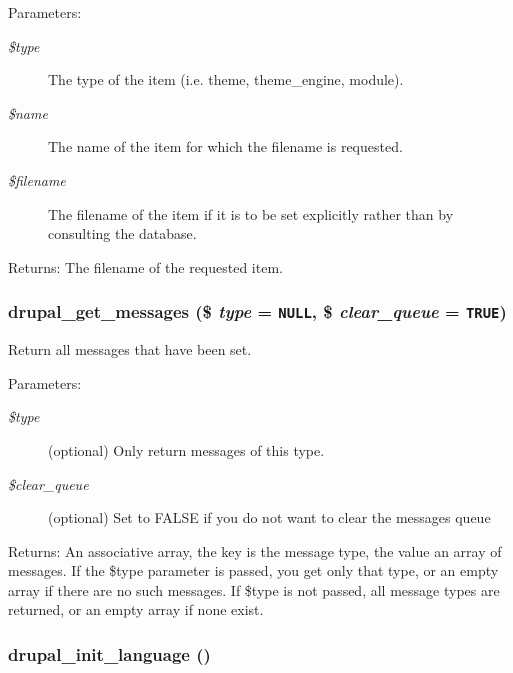 \begin{Desc}
\item[Parameters:]
\begin{description}
\item[{\em \$type}]The type of the item (i.e. theme, theme\_\-engine, module). \item[{\em \$name}]The name of the item for which the filename is requested. \item[{\em \$filename}]The filename of the item if it is to be set explicitly rather than by consulting the database.\end{description}
\end{Desc}
\begin{Desc}
\item[Returns:]The filename of the requested item. \end{Desc}
\hypertarget{bootstrap_8inc_2c9915d030bad8c5bacf6de25e6fd14c}{
\subsubsection[{drupal\_\-get\_\-messages}]{\setlength{\rightskip}{0pt plus 5cm}drupal\_\-get\_\-messages (\$ {\em type} = {\tt NULL}, \/  \$ {\em clear\_\-queue} = {\tt TRUE})}}
\label{bootstrap_8inc_2c9915d030bad8c5bacf6de25e6fd14c}


Return all messages that have been set.

\begin{Desc}
\item[Parameters:]
\begin{description}
\item[{\em \$type}](optional) Only return messages of this type. \item[{\em \$clear\_\-queue}](optional) Set to FALSE if you do not want to clear the messages queue \end{description}
\end{Desc}
\begin{Desc}
\item[Returns:]An associative array, the key is the message type, the value an array of messages. If the \$type parameter is passed, you get only that type, or an empty array if there are no such messages. If \$type is not passed, all message types are returned, or an empty array if none exist. \end{Desc}
\hypertarget{bootstrap_8inc_5f67d97a363fcc3f51bf6a7b135778e7}{
\subsubsection[{drupal\_\-init\_\-language}]{\setlength{\rightskip}{0pt plus 5cm}drupal\_\-init\_\-language ()}}
\label{bootstrap_8inc_5f67d97a363fcc3f51bf6a7b135778e7}



